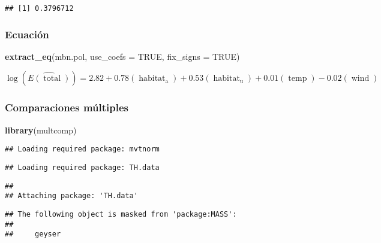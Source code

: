 \documentclass[
]{book}
\newenvironment{Shaded}{\begin{snugshade}}{\end{snugshade}}
\newcommand{\DataTypeTok}[1]{\textcolor[rgb]{0.13,0.29,0.53}{#1}}
\newcommand{\KeywordTok}[1]{\textcolor[rgb]{0.13,0.29,0.53}{\textbf{#1}}}
\newcommand{\NormalTok}[1]{#1}
\newcommand{\OtherTok}[1]{\textcolor[rgb]{0.56,0.35,0.01}{#1}}
\begin{document}
\begin{verbatim}
## [1] 0.3796712
\end{verbatim}

\hypertarget{ecuaciuxf3n-2}{%
\subsubsection{Ecuación}\label{ecuaciuxf3n-2}}

\begin{Shaded}
\begin{Highlighting}[]
\KeywordTok{extract_eq}\NormalTok{(mbn.pol, }\DataTypeTok{use_coefs =} \OtherTok{TRUE}\NormalTok{, }\DataTypeTok{fix_signs =} \OtherTok{TRUE}\NormalTok{)}
\end{Highlighting}
\end{Shaded}

\begin{equation}
\log ({ \widehat{E( \operatorname{total} )} })  = 2.82 + 0.78(\operatorname{habitat}_{\operatorname{a}}) + 0.53(\operatorname{habitat}_{\operatorname{u}}) + 0.01(\operatorname{temp}) - 0.02(\operatorname{wind})
\end{equation}

\hypertarget{comparaciones-muxfaltiples}{%
\subsubsection{Comparaciones múltiples}\label{comparaciones-muxfaltiples}}

\begin{Shaded}
\begin{Highlighting}[]
\KeywordTok{library}\NormalTok{(multcomp) }
\end{Highlighting}
\end{Shaded}

\begin{verbatim}
## Loading required package: mvtnorm
\end{verbatim}

\begin{verbatim}
## Loading required package: TH.data
\end{verbatim}

\begin{verbatim}
## 
## Attaching package: 'TH.data'
\end{verbatim}

\begin{verbatim}
## The following object is masked from 'package:MASS':
## 
##     geyser
\end{verbatim}
\end{document}
